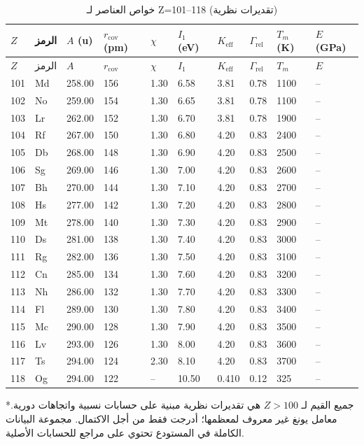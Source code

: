 \documentclass[11pt,a4paper]{article}
\newcommand{\Keff}{K_{\mathrm{eff}}}
\begin{document}
\begin{otherlanguage}{arabic}
		\begin{longtable}{p{0.6cm}p{1.2cm}p{1.2cm}p{1.2cm}p{1.2cm}p{1.2cm}p{1.5cm}p{1.2cm}p{1.2cm}p{1.2cm}}
			\caption{خواص العناصر لـ Z=101–118 (تقديرات نظرية)} \label{tab:elem-data-101to118} \\
			\toprule
			\(Z\) & الرمز & \(A\) (u) & \(r_{\text{cov}}\) (pm) & \(\chi\) & \(I_1\) (eV) & \(\Keff\) & \(\Gamma_{\text{rel}}\) & \(T_m\) (K) & \(E\) (GPa) \\
			\midrule
			\endfirsthead
			\toprule
			\(Z\) & الرمز & \(A\) & \(r_{\text{cov}}\) & \(\chi\) & \(I_1\) & \(\Keff\) & \(\Gamma_{\text{rel}}\) & \(T_m\) & \(E\) \\
			\midrule
			\endhead
			101 & Md & 258.00 & 156 & 1.30 & 6.58 & 3.81 & 0.78 & 1100 & – \\
			102 & No & 259.00 & 154 & 1.30 & 6.65 & 3.81 & 0.78 & 1100 & – \\
			103 & Lr & 262.00 & 152 & 1.30 & 6.70 & 3.81 & 0.78 & 1900 & – \\
			104 & Rf & 267.00 & 150 & 1.30 & 6.80 & 4.20 & 0.83 & 2400 & – \\
			105 & Db & 268.00 & 148 & 1.30 & 6.90 & 4.20 & 0.83 & 2500 & – \\
			106 & Sg & 269.00 & 146 & 1.30 & 7.00 & 4.20 & 0.83 & 2600 & – \\
			107 & Bh & 270.00 & 144 & 1.30 & 7.10 & 4.20 & 0.83 & 2700 & – \\
			108 & Hs & 277.00 & 142 & 1.30 & 7.20 & 4.20 & 0.83 & 2800 & – \\
			109 & Mt & 278.00 & 140 & 1.30 & 7.30 & 4.20 & 0.83 & 2900 & – \\
			110 & Ds & 281.00 & 138 & 1.30 & 7.40 & 4.20 & 0.83 & 3000 & – \\
			111 & Rg & 282.00 & 136 & 1.30 & 7.50 & 4.20 & 0.83 & 3100 & – \\
			112 & Cn & 285.00 & 134 & 1.30 & 7.60 & 4.20 & 0.83 & 3200 & – \\
			113 & Nh & 286.00 & 132 & 1.30 & 7.70 & 4.20 & 0.83 & 3300 & – \\
			114 & Fl & 289.00 & 130 & 1.30 & 7.80 & 4.20 & 0.83 & 3400 & – \\
			115 & Mc & 290.00 & 128 & 1.30 & 7.90 & 4.20 & 0.83 & 3500 & – \\
			116 & Lv & 293.00 & 126 & 1.30 & 8.00 & 4.20 & 0.83 & 3600 & – \\
			117 & Ts & 294.00 & 124 & 2.30 & 8.10 & 4.20 & 0.83 & 3700 & – \\
			118 & Og & 294.00 & 122 & –    & 10.50 & 0.410 & 0.12 & 325 & – \\
			\bottomrule
		\end{longtable}
		*جميع القيم لـ \(Z>100\) هي تقديرات نظرية مبنية على حسابات نسبية واتجاهات دورية. معامل يونغ غير معروف لمعظمها؛ أدرجت فقط من أجل الاكتمال. مجموعة البيانات الكاملة في المستودع تحتوي على مراجع للحسابات الأصلية.
		

\end{otherlanguage}
\end{document}
